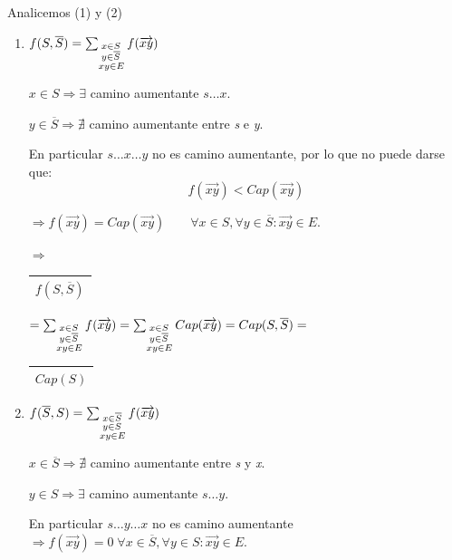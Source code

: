 \documentclass[12pt,a4paper]{report}
\begin{document}
					\vspace{2mm}
					\par Analicemos (1) y (2)
					\begin{enumerate}[(1)]
						\item $f(S, \overline{S}) = \sum_{\begin{subarray}{l} \; x \in S \\
							\; y \in \overline{S} \\ xy \in E\end{subarray}} f(\overrightarrow{xy}) $
							\par $x \in S \Rightarrow \exists$ camino aumentante $ s \dotsc x$.
							\par $y \in \overline{S} \Rightarrow \nexists$ camino aumentante entre \textit{s} e \textit{y}. 
							\par En particular $s \dotsc x \dotsc y$ no es camino aumentante, por lo que no puede darse que: 
							\[
								f(\overrightarrow{xy}) < Cap(\overrightarrow{xy})
							\]

							\vspace{3mm}
							\par $\Rightarrow f(\overrightarrow{xy}) = Cap(\overrightarrow{xy}) \qquad \forall x \in S, \forall y \in \overline{S} : \overrightarrow{xy} \in E.$

							\vspace{3mm}
							\par $\Rightarrow$ \begin{tabular}{|c|} \hline $f(S, \overline{S})$ \\\hline \end{tabular} $= \sum_{\begin{subarray}{l} \; x \in S\\  \; y \in \overline{S} \\ xy \in E\end{subarray}} f(\overrightarrow{xy}) = \sum_{\begin{subarray}{l} \; x \in S\\  \; y \in \overline{S} \\ xy \in E\end{subarray}} Cap(\overrightarrow{xy}) = Cap(S, \overline{S}) =$ \begin{tabular}{|c|} \hline $ Cap(S) $ \\ \hline \end{tabular}

						\item $f(\overline{S}, S) = \sum_{\begin{subarray}{l} \; x \in \overline{S} \\
							\; y \in S \\ xy \in E\end{subarray}} f(\overrightarrow{xy}) $
							\par $x \in \overline{S} \Rightarrow \nexists$ camino aumentante entre \textit{s} y \textit{x}.
							\par $y \in S \Rightarrow \exists$ camino aumentante $ s \dotsc y$.
							\par En particular $s \dotsc y \dotsc x$ no es camino aumentante $\Rightarrow f(\overrightarrow{xy}) = 0  \; \forall x \in \overline{S}, \forall y \in S : \overrightarrow{xy} \in E$.


\end{enumerate}
\end{document}

